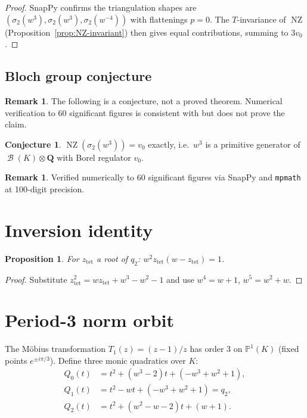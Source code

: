 \documentclass[12pt]{amsart}
\newtheorem{proposition}[theorem]{Proposition}
\theoremstyle{definition}
\newtheorem{remark}[theorem]{Remark}
\newtheorem{conjecture}[theorem]{Conjecture}
\newcommand{\QQ}{\mathbf{Q}}
\DeclareMathOperator{\NZ}{NZ}
\DeclareMathOperator{\Bloch}{\mathcal{B}}
\begin{document}
\begin{proof}
SnapPy confirms the triangulation shapes are $(\sigma_2(w^3), \sigma_2(w^3),
\sigma_2(w^{-4}))$ with flattenings $p = 0$.
The $T$-invariance of $\NZ$ (Proposition~\ref{prop:NZ-invariant}) then
gives equal contributions, summing to $3v_0$.
\end{proof}

\subsection{Bloch group conjecture}

\begin{remark}
The following is a conjecture, not a proved theorem.
Numerical verification to 60 significant figures is consistent
with but does not prove the claim.
\end{remark}

\begin{conjecture}\label{conj:bloch}
$\NZ(\sigma_2(w^3)) = v_0$ exactly, i.e.\ $w^3$ is a primitive
generator of $\Bloch(K) \otimes \QQ$ with Borel regulator $v_0$.
\end{conjecture}

\begin{remark}
Verified numerically to 60 significant figures via SnapPy and
\texttt{mpmath} at 100-digit precision.
\end{remark}

\section{Inversion identity}

\begin{proposition}\label{prop:inversion}
For $z_{\mathrm{tet}}$ a root of $q_2$:
$w^2 z_{\mathrm{tet}}(w - z_{\mathrm{tet}}) = 1$.
\end{proposition}

\begin{proof}
Substitute $z_{\mathrm{tet}}^2 = wz_{\mathrm{tet}} + w^3 - w^2 - 1$ and
use $w^4 = w+1$, $w^5 = w^2+w$.
\end{proof}

\section{Period-3 norm orbit}

The M\"{o}bius transformation $T_1(z) = (z-1)/z$ has order 3 on
$\mathbb{P}^1(K)$ (fixed points $e^{\pm i\pi/3}$).
Define three monic quadratics over $K$:
\begin{align*}
  Q_0(t) &= t^2 + (w^3-2)t + (-w^3+w^2+1),\\
  Q_1(t) &= t^2 - wt + (-w^3+w^2+1) = q_2,\\
  Q_2(t) &= t^2 + (w^2-w-2)t + (w+1).
\end{align*}
\end{document}

